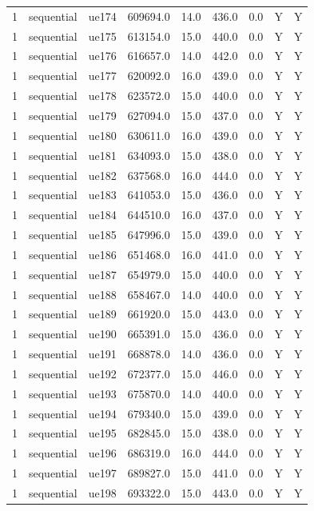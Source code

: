 \begin{table}[ht]
\begin{tabular}{|c|c|c|c|c|c|c|c|c|}
1 & sequential & ue174 & 609694.0 & 14.0 & 436.0 & 0.0 & Y & Y \\
1 & sequential & ue175 & 613154.0 & 15.0 & 440.0 & 0.0 & Y & Y \\
1 & sequential & ue176 & 616657.0 & 14.0 & 442.0 & 0.0 & Y & Y \\
1 & sequential & ue177 & 620092.0 & 16.0 & 439.0 & 0.0 & Y & Y \\
1 & sequential & ue178 & 623572.0 & 15.0 & 440.0 & 0.0 & Y & Y \\
1 & sequential & ue179 & 627094.0 & 15.0 & 437.0 & 0.0 & Y & Y \\
1 & sequential & ue180 & 630611.0 & 16.0 & 439.0 & 0.0 & Y & Y \\
1 & sequential & ue181 & 634093.0 & 15.0 & 438.0 & 0.0 & Y & Y \\
1 & sequential & ue182 & 637568.0 & 16.0 & 444.0 & 0.0 & Y & Y \\
1 & sequential & ue183 & 641053.0 & 15.0 & 436.0 & 0.0 & Y & Y \\
1 & sequential & ue184 & 644510.0 & 16.0 & 437.0 & 0.0 & Y & Y \\
1 & sequential & ue185 & 647996.0 & 15.0 & 439.0 & 0.0 & Y & Y \\
1 & sequential & ue186 & 651468.0 & 16.0 & 441.0 & 0.0 & Y & Y \\
1 & sequential & ue187 & 654979.0 & 15.0 & 440.0 & 0.0 & Y & Y \\
1 & sequential & ue188 & 658467.0 & 14.0 & 440.0 & 0.0 & Y & Y \\
1 & sequential & ue189 & 661920.0 & 15.0 & 443.0 & 0.0 & Y & Y \\
1 & sequential & ue190 & 665391.0 & 15.0 & 436.0 & 0.0 & Y & Y \\
1 & sequential & ue191 & 668878.0 & 14.0 & 436.0 & 0.0 & Y & Y \\
1 & sequential & ue192 & 672377.0 & 15.0 & 446.0 & 0.0 & Y & Y \\
1 & sequential & ue193 & 675870.0 & 14.0 & 440.0 & 0.0 & Y & Y \\
1 & sequential & ue194 & 679340.0 & 15.0 & 439.0 & 0.0 & Y & Y \\
1 & sequential & ue195 & 682845.0 & 15.0 & 438.0 & 0.0 & Y & Y \\
1 & sequential & ue196 & 686319.0 & 16.0 & 444.0 & 0.0 & Y & Y \\
1 & sequential & ue197 & 689827.0 & 15.0 & 441.0 & 0.0 & Y & Y \\
1 & sequential & ue198 & 693322.0 & 15.0 & 443.0 & 0.0 & Y & Y \\

\end{tabular}
\end{table}
